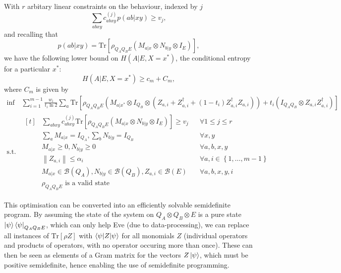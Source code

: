 \documentclass[10pt, a4paper]{article}
\numberwithin{equation}{section} %
\theoremstyle{definition}
\theoremstyle{plain}
\newcommand{\norm}[1]{\left\lVert#1\right\rVert}
\newcommand{\dintv}[2]{\left\{#1,\ldots,#2\right\}}
\newcommand{\?}{\mathrel{?}} %
\newcommand{\Tr}{\mathrm{Tr}} %
\newcommand{\sB}{\mathcal{B}}
\begin{document}
      With \(r\) arbitary linear constraints on the behaviour, indexed by \(j\)
      \[ \sum_{abxy} c^{(j)}_{abxy} p(ab|xy) \geq v_j, \]
      and recalling that
      \[ p(ab|xy) = \Tr\left[\rho_{Q_A Q_B E} \left(M_{a|x} \otimes N_{b|y} \otimes I_{E}\right) \right], \]
      we have the following lower bound on \(H(A|E, X=x^*)\), the conditional entropy for a particular \(x^*\):
      \begin{equation}
        H(A|E, X=x^*) \geq c_m + C_m,
      \end{equation}
      where \(C_m\) is given by
      \begin{align}
        \inf & \sum_{i=1}^{m-1} \frac{w_i}{t_i \ln 2} \sum_a \Tr\left[ \rho_{Q_A Q_B E} \left(M_{a|x^*} \otimes I_{Q_B} \otimes \left( Z_{a,i} + Z_{a,i}^{\dagger} + (1-t_i)  Z_{a,i}^{\dagger}Z_{a,i}\right) \right) + t_i \left( I_{Q_A Q_B} \otimes Z_{a,i}Z_{a,i}^{\dagger}\right)\right] \\
        \text{s.t.} & \begin{aligned}[t] 
          & \sum_{abxy} c^{(j)}_{abxy} \Tr\left[\rho_{Q_A Q_B E} \left(M_{a|x} \otimes N_{b|y} \otimes I_{E}\right) \right] \geq v_j & & \forall 1 \leq j \leq r \\
          & \sum_{a} M_{a|x} = I_{Q_A}, \sum_{b} N_{b|y} = I_{Q_B} & & \forall x, y \\
          & M_{a|x} \geq 0, N_{b|y} \geq 0 & & \forall a, b, x, y \\
          & \norm{Z_{a,i}} \leq \alpha_i & & \forall a, i \in \dintv{1}{m-1} \\
          & M_{a|x} \in \sB(Q_A), N_{b|y} \in \sB(Q_B), Z_{a,i} \in \sB(E) & & \forall a, b, x, y, i \\
          & \rho_{Q_A Q_B E} \text{ is a valid state} & &
        \end{aligned}
      \end{align}

      This optimisation can be converted into an efficiently solvable semidefinite program. By assuming the state of the system on \(Q_A \otimes Q_B \otimes E\) is a pure state \(\ket{\psi}\bra{\psi}_{Q_A Q_B E}\), which can only help Eve (due to data-processing), we can replace all instances of \(\Tr\left[\rho Z\right]\) with \(\braket{\psi|Z|\psi}\) for all monomials \(Z\) (individual operators and products of operators, with no operator occuring more than once). These can then be seen as elements of a Gram matrix for the vectors \(Z\ket{\psi}\), which must be positive semidefinite, hence enabling the use of semidefinite programming.
\end{document}
